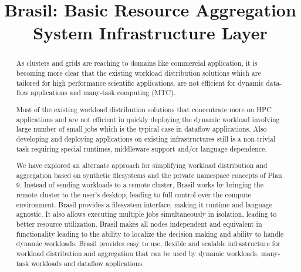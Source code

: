 \documentclass[conference]{sig-alternate}
\begin{document}
\title{Brasil: Basic Resource Aggregation System Infrastructure Layer}


\author{
\and
{}
}

\maketitle

\begin{abstract}


As clusters and grids are reaching to domains like commercial application, it
is becoming more clear that the existing workload distribution solutions which
are tailored for high performance scientific applications, are not efficient
for dynamic data-flow applications and many-task computing (MTC).

Most of the existing workload distribution solutions that concentrate more on
HPC applications and are not efficient in quickly deploying the dynamic
workload involving large number of small jobs which is the typical case in
dataflow applications. Also developing and deploying applications on existing
infrastructures still is a non-trivial task requiring special runtimes,
middleware support and/or language dependence.

We have explored an alternate approach for simplifying workload
distribution and aggregation based on synthetic filesystems and the private
namespace concepts of Plan 9.  Instead of sending workloads to a remote
cluster, Brasil works by bringing the remote cluster to the user's desktop,
leading to full control over the compute environment.   Brasil provides
a filesystem interface, making it runtime and language agnostic.  It also
allows executing multiple jobs simultaneously in isolation, leading to
better resource utilization.  Brasil makes all nodes independent and
equivalent in functionality leading to the ability to localize the
decision making and ability to handle dynamic workloads.  Brasil provides easy to
use, flexible and scalable infrastructure for workload distribution and
aggregation that can be used by dynamic workloads, many-task workloads and
dataflow applications.

\end{abstract}
\end{document}

